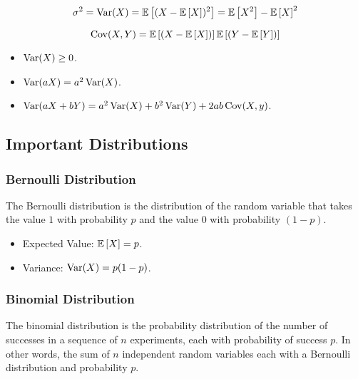 \documentclass[12pt, titlepage]{article}
\begin{document}
\begin{dfn}[Variance]{}
\[\sigma^2 = \operatorname{Var}(X) = \mathbb{E}\left[(X - \mathbb{E}\left[X\right])^2\right] = \mathbb{E}\left[X^2\right] - \mathbb{E}\left[X\right]^2\]
\end{dfn}

\begin{dfn}[Covariance]{}
\[\operatorname{Cov}(X, Y) = \mathbb{E}\left[(X - \mathbb{E}\left[X\right])\right]\mathbb{E}\left[(Y - \mathbb{E}\left[Y\right])\right]\]
\end{dfn}

\begin{rmk}{}
\begin{itemize}
	\item $\operatorname{Var}(X) \geq 0$.
	\item $\operatorname{Var}(aX) = a^2\operatorname{Var}(X)$.
	\item $\operatorname{Var}(aX + bY) = a^2\operatorname{Var}(X) + b^2\operatorname{Var}(Y) + 2ab\operatorname{Cov}(X, y)$.
	
\end{itemize}
\end{rmk}

\subsection{Important Distributions}

\subsubsection{Bernoulli Distribution}

\begin{rmk}
The Bernoulli distribution is the distribution of the random variable that takes the value $1$ with probability $p$ and the value $0$ with probability $(1-p)$.
\end{rmk}

\begin{info}{}
\begin{itemize}
	\item Expected Value: $\mathbb{E}\left[X\right] = p$.
	\item Variance: $\operatorname{Var}(X) = p(1-p)$.
\end{itemize}
\end{info}

\subsubsection{Binomial Distribution}

\begin{rmk}
The binomial distribution is the probability distribution of the number of successes in a sequence of $n$ experiments, each with probability of success $p$. In other words, the sum of $n$ independent random variables each with a Bernoulli distribution and probability $p$. 
\end{rmk}
\end{document}
